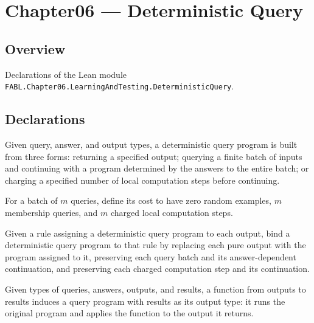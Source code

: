 \chapter{Chapter06 — Deterministic Query}
\section{Overview}

Declarations of the Lean module \texttt{FABL.Chapter06.LearningAndTesting.DeterministicQuery}.

\section{Declarations}

\begin{definition}
\label{FABL.DeterministicQueryProgram}
\leanok
Given query, answer, and output types, a deterministic query program is built from three
forms: returning a specified output; querying a finite batch of inputs and continuing
with a program determined by the answers to the entire batch; or charging a specified
number of local computation steps before continuing.
\end{definition}

\begin{definition}
\label{FABL.DeterministicQueryProgram.queryBatchCost}
\leanok
{}
For a batch of $m$ queries, define its cost to have zero random examples, $m$ membership
queries, and $m$ charged local computation steps.
\end{definition}

\begin{definition}
\label{FABL.DeterministicQueryProgram.bind}
\leanok
{}
Given a rule assigning a deterministic query program to each output, bind a
deterministic query program to that rule by replacing each pure output with the program
assigned to it, preserving each query batch and its answer-dependent continuation, and
preserving each charged computation step and its continuation.
\end{definition}

\begin{definition}
\label{FABL.DeterministicQueryProgram.map}
\leanok
{}
Given types of queries, answers, outputs, and results, a function from outputs to
results induces a query program with results as its output type: it runs the original
program and applies the function to the output it returns.
\end{definition}

